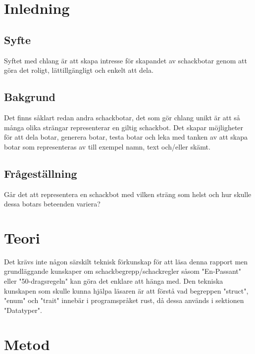 \documentclass{article}
\begin{document}
	\section{Inledning}

	\subsection{Syfte}
	Syftet med chlang är att skapa intresse för skapandet av schackbotar genom att göra det roligt, lättillgängligt och enkelt att dela.
	
	\subsection{Bakgrund}
	Det finns såklart redan andra schackbotar, det som gör chlang unikt är att så många olika strängar representerar en giltig schackbot. Det skapar möjligheter för att dela botar, generera botar, testa botar och leka med tanken av att skapa botar som representeras av till exempel namn, text och/eller skämt.
	
	\subsection{Frågeställning}
	Går det att representera en schackbot med vilken sträng som helst och hur skulle dessa botars beteenden variera?

	\newpage
	\section{Teori}
    Det krävs inte någon särskilt teknisk förkunskap för att läsa denna
    rapport men grundläggande kunskaper om schackbegrepp/schackregler såsom
    "En-Passant" eller "50-dragsregeln" kan göra det enklare att hänga med. 
    Den tekniska kunskapen som skulle kunna hjälpa läsaren är att förstå vad
    begreppen "struct", "enum" och "trait" innebär i programspråket rust, då
    dessa används i sektionen "Datatyper".
	
	

	\newpage
	\section{Metod}
\end{document}
